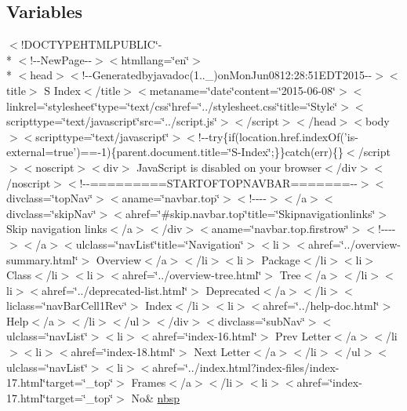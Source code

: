 \subsection*{Variables}
\begin{DoxyCompactItemize}
\item 
$<$!D\-O\-C\-T\-Y\-P\-E\-H\-T\-M\-L\-P\-U\-B\-L\-I\-C\char`\"{}-\/\\*
$<$!-\/-\/New\-Page-\/-\/$>$$<$htmllang=\char`\"{}en\char`\"{}$>$\\*
$<$head$>$$<$!-\/-\/Generatedbyjavadoc(1..\-\_)on\-Mon\-Jun0812\-:28\-:51\-E\-D\-T2015-\/-\/$>$$<$title$>$ S Index$<$/title$>$$<$metaname=\char`\"{}date\char`\"{}content=\char`\"{}2015-\/06-\/08\char`\"{}$>$$<$linkrel=\char`\"{}stylesheet\char`\"{}type=\char`\"{}text/css\char`\"{}href=\char`\"{}../stylesheet.\-css\char`\"{}title=\char`\"{}\-Style\char`\"{}$>$$<$scripttype=\char`\"{}text/javascript\char`\"{}src=\char`\"{}../script.\-js\char`\"{}$>$$<$/script$>$$<$/head$>$$<$body$>$$<$scripttype=\char`\"{}text/javascript\char`\"{}$>$$<$!-\/-\/try\{if(location.\-href.\-index\-Of('is-\/external=true')==-\/1)\{parent.\-document.\-title=\char`\"{}\-S-\/\-Index\char`\"{};\}\}catch(err)\{\}$<$/script$>$$<$noscript$>$$<$div$>$ Java\-Script is disabled on your browser$<$/div$>$$<$/noscript$>$$<$!-\/-\/=========\-S\-T\-A\-R\-T\-O\-F\-T\-O\-P\-N\-A\-V\-B\-A\-R=======-\/-\/$>$$<$divclass=\char`\"{}top\-Nav\char`\"{}$>$$<$aname=\char`\"{}navbar.\-top\char`\"{}$>$$<$!-\/-\/-\/-\/$>$$<$/a$>$$<$divclass=\char`\"{}skip\-Nav\char`\"{}$>$$<$ahref=\char`\"{}\#skip.\-navbar.\-top\char`\"{}title=\char`\"{}\-Skipnavigationlinks\char`\"{}$>$ Skip navigation links$<$/a$>$$<$/div$>$$<$aname=\char`\"{}navbar.\-top.\-firstrow\char`\"{}$>$$<$!-\/-\/-\/-\/$>$$<$/a$>$$<$ulclass=\char`\"{}nav\-List\char`\"{}title=\char`\"{}\-Navigation\char`\"{}$>$$<$li$>$$<$ahref=\char`\"{}../overview-\/summary.\-html\char`\"{}$>$ Overview$<$/a$>$$<$/li$>$$<$li$>$ Package$<$/li$>$$<$li$>$ Class$<$/li$>$$<$li$>$$<$ahref=\char`\"{}../overview-\/tree.\-html\char`\"{}$>$ Tree$<$/a$>$$<$/li$>$$<$li$>$$<$ahref=\char`\"{}../deprecated-\/list.\-html\char`\"{}$>$ Deprecated$<$/a$>$$<$/li$>$$<$liclass=\char`\"{}nav\-Bar\-Cell1\-Rev\char`\"{}$>$ Index$<$/li$>$$<$li$>$$<$ahref=\char`\"{}../help-\/doc.\-html\char`\"{}$>$ Help$<$/a$>$$<$/li$>$$<$/ul$>$$<$/div$>$$<$divclass=\char`\"{}sub\-Nav\char`\"{}$>$$<$ulclass=\char`\"{}nav\-List\char`\"{}$>$$<$li$>$$<$ahref=\char`\"{}index-\/16.\-html\char`\"{}$>$ Prev Letter$<$/a$>$$<$/li$>$$<$li$>$$<$ahref=\char`\"{}index-\/18.\-html\char`\"{}$>$ Next Letter$<$/a$>$$<$/li$>$$<$/ul$>$$<$ulclass=\char`\"{}nav\-List\char`\"{}$>$$<$li$>$$<$ahref=\char`\"{}../index.\-html?index-\/files/index-\/17.\-html\char`\"{}target=\char`\"{}\-\_\-top\char`\"{}$>$ Frames$<$/a$>$$<$/li$>$$<$li$>$$<$ahref=\char`\"{}index-\/17.\-html\char`\"{}target=\char`\"{}\-\_\-top\char`\"{}$>$ No\& \hyperlink{index-17_8html_a479d00f21dbca369efe3be97f1ef785a}{nbsp}
\end{DoxyCompactItemize}


